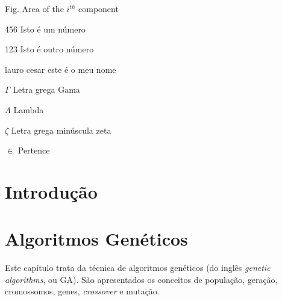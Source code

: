 \documentclass[12pt,oneside,a4paper,english,french,spanish,brazil,]{abntex2}
\begin{document}
\begin{siglas}
  \item[Fig.] Area of the $i^{th}$ component
  \item[456] Isto é um número
  \item[123] Isto é outro número
  \item[lauro cesar] este é o meu nome
\end{siglas}

\begin{simbolos}
  \item[$ \Gamma $] Letra grega Gama
  \item[$ \Lambda $] Lambda
  \item[$ \zeta $] Letra grega minúscula zeta
  \item[$ \in $] Pertence
\end{simbolos}

\tableofcontents*
\cleardoublepage


\textual

\chapter{Introdução}

\chapter{Algoritmos Genéticos}

Este capítulo trata da técnica de algoritmos genéticos (do inglês \textit{genetic algorithms}, ou GA). São apresentados os conceitos de população, geração, cromossomos, genes, \textit{crossover} e mutação.
\end{document}

